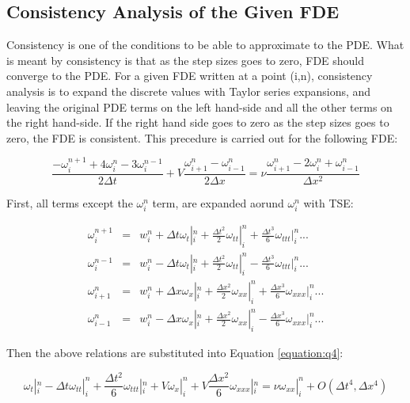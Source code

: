 \documentclass[letterpaper,12pt]{article}
\begin{document}
\newpage
\subsection{Consistency Analysis of the Given FDE}
Consistency is one of the conditions to be able to approximate to the PDE. What is meant by consistency is
that as the step sizes goes to zero, FDE should converge to the PDE. For a given FDE written at a point
(i,n), consistency analysis is to expand the discrete values with Taylor series expansions, and leaving
the original PDE terms on the left hand-side and all the other terms on the right hand-side. If the right
hand side goes to zero as the step sizes goes to zero, the FDE is consistent. This precedure is carried
out for the following FDE: 

\begin{equation}
	\frac{-\omega^{n+1}_{i}+4\omega^{n}_{i}-3\omega^{n-1}_{i}}{2\Delta t} + V\frac{\omega^{n}_{i+1}-\omega^{n}_{i-1}}{2\Delta x} = \nu\frac{\omega^{n}_{i+1}-2\omega^{n}_{i}+\omega^{n}_{i-1}}{\Delta x^2}
	\label{equation:q4}
\end{equation}

First, all terms except the $\omega^{n}_{i}$ term, are expanded aorund $\omega^{n}_{i}$ with TSE:

\begin{eqnarray}
	\omega^{n+1}_i &=& w^n_i + \Delta t \omega_t|^n_i + \frac{\Delta t^2}{2} \omega_{tt}|^n_i + \frac{\Delta t^3}{6} \omega_{ttt}|^n_i ... \nonumber \\
	\omega^{n-1}_i &=& w^n_i - \Delta t \omega_t|^n_i + \frac{\Delta t^2}{2} \omega_{tt}|^n_i - \frac{\Delta t^3}{6} \omega_{ttt}|^n_i ... \nonumber \\
	\omega^n_{i+1} &=& w^n_i + \Delta x \omega_x|^n_i + \frac{\Delta x^2}{2} \omega_{xx}|^n_i + \frac{\Delta x^3}{6} \omega_{xxx}|^n_i ... \nonumber \\
	\omega^n_{i-1} &=& w^n_i - \Delta x \omega_x|^n_i + \frac{\Delta x^2}{2} \omega_{xx}|^n_i - \frac{\Delta x^3}{6} \omega_{xxx}|^n_i ... 
\end{eqnarray}

Then the above relations are substituted into Equation \ref{equation:q4}:

\begin{equation}
	\omega_t|^n_i - \Delta t \omega_{tt}|^n_i + \frac{\Delta t^2}{6} \omega_{ttt}|^n_i + V\omega_x|^n_i + V\frac{\Delta x^2}{6}\omega_{xxx}|^n_i = \nu\omega_{xx}|^n_i + O(\Delta t^4,\Delta x^4)
\end{equation}
\end{document}
